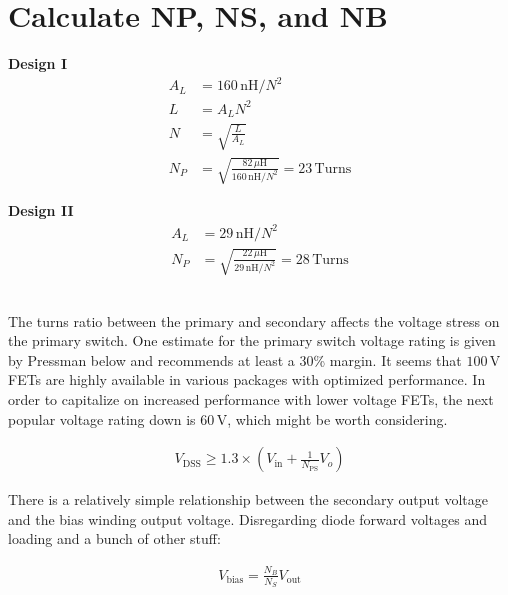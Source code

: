 \documentclass{article}
\begin{document}
\section{Calculate NP, NS, and NB}
\begin{minipage}[t]{0.45\linewidth}
    \textbf{Design I}
    \begin{align*}
    A_L &= 160 \, \text{nH}/N^2 \\
    L &= A_L N^2 \\
    N &= \sqrt{\frac{L}{A_L}} \\
    N_P &= \sqrt{\frac{82 \, \mu\text{H}}{160 \, \text{nH}/N^2}} = 23 \, \text{Turns}
    \end{align*}
\end{minipage}
\begin{minipage}[t]{0.45\linewidth}
    \textbf{Design II}
    \begin{align*}
    A_L &= 29 \, \text{nH}/N^2 \\
    N_P &= \sqrt{\frac{22 \, \mu\text{H}}{29 \, \text{nH}/N^2}} = 28 \, \text{Turns}
    \end{align*}
\end{minipage} \\

The turns ratio between the primary and secondary affects the voltage stress on the primary switch. One estimate for the primary switch voltage rating is given by Pressman below and recommends at least a 30\% margin. It seems that \(100 \, \text{V}\) FETs are highly available in various packages with optimized performance. In order to capitalize on increased performance with lower voltage FETs, the next popular voltage rating down is \(60 \, \text{V}\), which might be worth considering.

\begin{align}
V_\text{DSS} \geq 1.3 \times \left( V_\text{in} + \frac{1}{N_\text{PS}} V_o \right)
\end{align}

There is a relatively simple relationship between the secondary output voltage and the bias winding output voltage.  Disregarding diode forward voltages and loading and a bunch of other stuff:

\begin{align}
V_\text{bias} = \frac{N_B}{N_S} V_\text{out}
\end{align} \\
\end{document}
